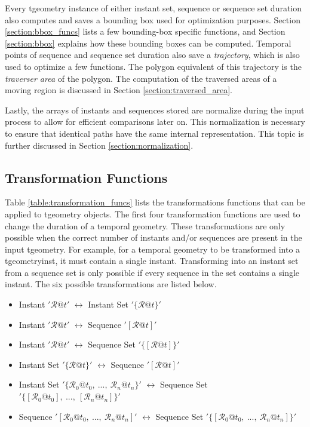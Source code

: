 Every tgeometry instance of either instant set, sequence or sequence set duration also computes and saves a bounding box used for optimization purposes. Section \ref{section:bbox_funcs} lists a few bounding-box specific functions, and Section \ref{section:bbox} explains how these bounding boxes can be computed. Temporal points of sequence and sequence set duration also save a \textit{trajectory}, which is also used to optimize a few functions. The polygon equivalent of this trajectory is the \textit{traverser area} of the polygon. The computation of the traversed areas of a moving region is discussed in Section \ref{section:traversed_area}.

Lastly, the arrays of instants and sequences stored are normalize during the input process to allow for efficient comparisons later on. This normalization is necessary to ensure that identical paths have the same internal representation. This topic is further discussed in Section \ref{section:normalization}.

\subsection{Transformation Functions}
\label{section:transformation_funcs}

Table \ref{table:transformation_funcs} lists the transformations functions that can be applied to tgeometry objects. The first four transformation functions are used to change the duration of a temporal geometry. These transformations are only possible when the correct number of instants and/or sequences are present in the input tgeometry. For example, for a temporal geometry to be transformed into a tgeometryinst, it must contain a single instant. Transforming into an instant set from a sequence set is only possible if every sequence in the set contains a single instant. The six possible transformations are listed below.

\begin{itemize}
    \item Instant $'\mathcal{R}@t'$ $\leftrightarrow$ Instant Set $'\{\mathcal{R}@t\}'$
    \item Instant $'\mathcal{R}@t'$ $\leftrightarrow$ Sequence $'[\mathcal{R}@t]'$
    \item Instant $'\mathcal{R}@t'$ $\leftrightarrow$ Sequence Set $'\{[\mathcal{R}@t]\}'$
    \item Instant Set $'\{\mathcal{R}@t\}'$ $\leftrightarrow$ Sequence $'[\mathcal{R}@t]'$
    \item Instant Set $'\{\mathcal{R}_0@t_0,\ ...,\ \mathcal{R}_n@t_n\}'$ $\leftrightarrow$ Sequence Set $'\{[\mathcal{R}_0@t_0],\ ...,\ [\mathcal{R}_n@t_n]\}'$
    \item Sequence $'[\mathcal{R}_0@t_0,\ ...,\ \mathcal{R}_n@t_n]'$ $\leftrightarrow$ Sequence Set $'\{[\mathcal{R}_0@t_0,\ ...,\ \mathcal{R}_n@t_n]\}'$
\end{itemize}

